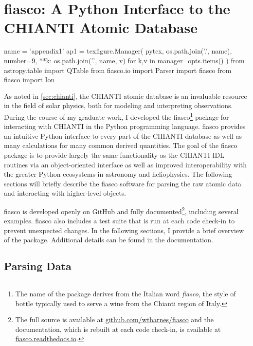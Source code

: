 \chapter{fiasco: A Python Interface to the CHIANTI Atomic Database}\label{ap:fiasco}

\begin{pycode}[appendix1]
name = 'appendix1'
ap1 = texfigure.Manager(
    pytex,
    os.path.join('.', name),
    number=9,
    **{k: os.path.join('.', name, v) for k,v in manager_opts.items()}
)
from astropy.table import QTable
from fiasco.io import Parser
import fiasco
from fiasco import Ion
\end{pycode}

As noted in \autoref{sec:chianti}, the CHIANTI atomic database is an invaluable resource in the field of solar physics, both for modeling and interpreting observations. During the course of my graduate work, I developed the fiasco\footnote{The name of the package derives from the Italian word \textit{fiasco}, the style of bottle typically used to serve a wine from the Chianti region of Italy.} package for interacting with CHIANTI in the Python programming language. fiasco provides an intuitive Python interface to every part of the CHIANTI database as well as many calculations for many common derived quantities. The goal of the fiasco package is to provide largely the same functionality as the CHIANTI IDL routines via an object-oriented interface \citep[similar to ChiantiPy][]{landi_chiantiatomic_2012,barnes_chiantipy_2017} as well as improved interoperability with the greater Python ecosystems in astronomy and heliophysics. The following sections will briefly describe the fiasco software for parsing the raw atomic data and interacting with higher-level objects.

fiasco is developed openly on GitHub and fully documented\footnote{The full source is available at \href{https://github.com/wtbarnes/fiasco}{github.com/wtbarnes/fiasco} and the documentation, which is rebuilt at each code check-in, is available at \href{https://fiasco.readthedocs.io/en/latest/}{fiasco.readthedocs.io}.}, including several examples. fiasco also includes a test suite that is run at each code check-in to prevent unexpected changes. In the following sections, I provide a brief overview of the package. Additional details can be found in the documentation.  

\section{Parsing Data}\label{sec:parsing-chianti}

